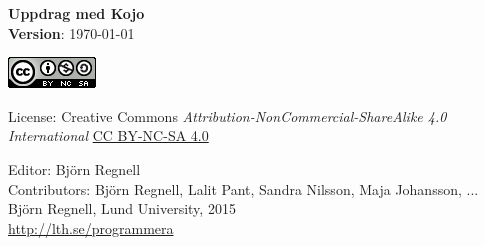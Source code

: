 { \vspace{250mm}\fontsize{11}{11}\flushleft\selectfont 
\vspace*{\fill}

\begin{center}
\Huge {\bf Uppdrag med Kojo}\\
\Large {\bf Version}: \today{ }
\end{center}
\vskip7cm

\large
\includegraphics{../img/cc.png}

License: Creative Commons {\it Attribution-NonCommercial-ShareAlike 4.0 International} 
\href{http://creativecommons.org/licenses/by-nc-sa/4.0/}{CC BY-NC-SA 4.0}

Editor: Björn Regnell\\
Contributors: Björn Regnell, Lalit Pant, Sandra Nilsson, Maja Johansson, ... \\
\textcopyright{ }Björn Regnell, Lund University, 2015 \\
\url{http://lth.se/programmera}
}